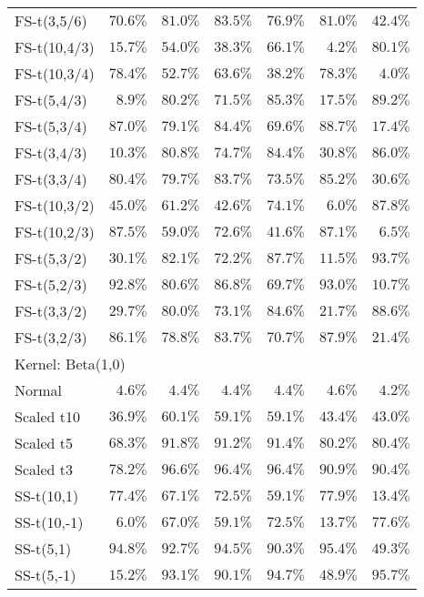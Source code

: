 \begin{longtable}{lrrrrrr}
FS-t(3,5/6) & $70.6\%$ & $81.0\%$ & $83.5\%$ & $76.9\%$ & $81.0\%$ & $42.4\%$ \\ 
FS-t(10,4/3) & $15.7\%$ & $54.0\%$ & $38.3\%$ & $66.1\%$ & $4.2\%$ & $80.1\%$ \\ 
FS-t(10,3/4) & $78.4\%$ & $52.7\%$ & $63.6\%$ & $38.2\%$ & $78.3\%$ & $4.0\%$ \\ 
FS-t(5,4/3) & $8.9\%$ & $80.2\%$ & $71.5\%$ & $85.3\%$ & $17.5\%$ & $89.2\%$ \\ 
FS-t(5,3/4) & $87.0\%$ & $79.1\%$ & $84.4\%$ & $69.6\%$ & $88.7\%$ & $17.4\%$ \\ 
FS-t(3,4/3) & $10.3\%$ & $80.8\%$ & $74.7\%$ & $84.4\%$ & $30.8\%$ & $86.0\%$ \\ 
FS-t(3,3/4) & $80.4\%$ & $79.7\%$ & $83.7\%$ & $73.5\%$ & $85.2\%$ & $30.6\%$ \\ 
FS-t(10,3/2) & $45.0\%$ & $61.2\%$ & $42.6\%$ & $74.1\%$ & $6.0\%$ & $87.8\%$ \\ 
FS-t(10,2/3) & $87.5\%$ & $59.0\%$ & $72.6\%$ & $41.6\%$ & $87.1\%$ & $6.5\%$ \\ 
FS-t(5,3/2) & $30.1\%$ & $82.1\%$ & $72.2\%$ & $87.7\%$ & $11.5\%$ & $93.7\%$ \\ 
FS-t(5,2/3) & $92.8\%$ & $80.6\%$ & $86.8\%$ & $69.7\%$ & $93.0\%$ & $10.7\%$ \\ 
FS-t(3,3/2) & $29.7\%$ & $80.0\%$ & $73.1\%$ & $84.6\%$ & $21.7\%$ & $88.6\%$ \\ 
FS-t(3,2/3) & $86.1\%$ & $78.8\%$ & $83.7\%$ & $70.7\%$ & $87.9\%$ & $21.4\%$ \\ 
\midrule
\multicolumn{7}{l}{Kernel: Beta(1,0)} \\ 
\midrule
Normal & $4.6\%$ & $4.4\%$ & $4.4\%$ & $4.4\%$ & $4.6\%$ & $4.2\%$ \\ 
Scaled t10 & $36.9\%$ & $60.1\%$ & $59.1\%$ & $59.1\%$ & $43.4\%$ & $43.0\%$ \\ 
Scaled t5 & $68.3\%$ & $91.8\%$ & $91.2\%$ & $91.4\%$ & $80.2\%$ & $80.4\%$ \\ 
Scaled t3 & $78.2\%$ & $96.6\%$ & $96.4\%$ & $96.4\%$ & $90.9\%$ & $90.4\%$ \\ 
SS-t(10,1) & $77.4\%$ & $67.1\%$ & $72.5\%$ & $59.1\%$ & $77.9\%$ & $13.4\%$ \\ 
SS-t(10,-1) & $6.0\%$ & $67.0\%$ & $59.1\%$ & $72.5\%$ & $13.7\%$ & $77.6\%$ \\ 
SS-t(5,1) & $94.8\%$ & $92.7\%$ & $94.5\%$ & $90.3\%$ & $95.4\%$ & $49.3\%$ \\ 
SS-t(5,-1) & $15.2\%$ & $93.1\%$ & $90.1\%$ & $94.7\%$ & $48.9\%$ & $95.7\%$ \\ 

\end{longtable}
